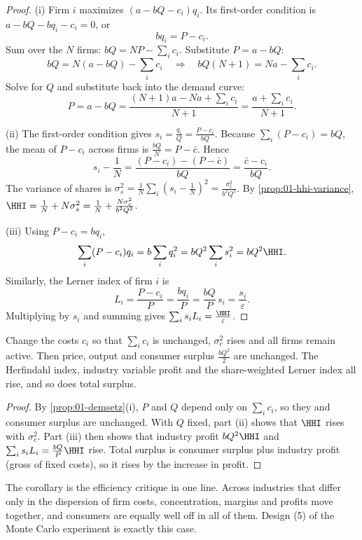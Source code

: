 \begin{proof}
(i) Firm $i$ maximizes $(a - bQ - c_i) q_i$. Its first-order condition is $a - bQ - b q_i - c_i = 0$, or
\[
b q_i = P - c_i .
\]
Sum over the $N$ firms: $bQ = NP - \sum_i c_i$. Substitute $P = a - bQ$:
\[
bQ = N(a - bQ) - \sum_i c_i \quad\Longrightarrow\quad bQ(N + 1) = Na - \sum_i c_i .
\]
Solve for $Q$ and substitute back into the demand curve:
\[
P = a - bQ = \frac{(N + 1)a - Na + \sum_i c_i}{N + 1} = \frac{a + \sum_i c_i}{N + 1}.
\]

(ii) The first-order condition gives $s_i = \frac{q_i}{Q} = \frac{P - c_i}{bQ}$. Because $\sum_i (P - c_i)
= bQ$, the mean of $P - c_i$ across firms is $\frac{bQ}{N} = P - \bar c$. Hence
\[
s_i - \frac{1}{N} = \frac{(P - c_i) - (P - \bar c)}{bQ} = \frac{\bar c - c_i}{bQ}.
\]
The variance of shares is $\sigma_s^2 = \frac{1}{N}\sum_i (s_i - \frac{1}{N})^2 = \frac{\sigma_c^2}{b^2
Q^2}$. By \cref{prop:01-hhi-variance}, $\HHI = \frac{1}{N} + N\sigma_s^2 = \frac{1}{N} + \frac{N
\sigma_c^2}{b^2 Q^2}$.

(iii) Using $P - c_i = b q_i$,
\[
\sum_i (P - c_i) q_i = b \sum_i q_i^2 = bQ^2 \sum_i s_i^2 = bQ^2 \HHI .
\]
Similarly, the Lerner index of firm $i$ is
\[
L_i = \frac{P - c_i}{P} = \frac{b q_i}{P} = \frac{bQ}{P} \, s_i = \frac{s_i}{\varepsilon}.
\]
Multiplying by $s_i$ and summing gives $\sum_i s_i L_i = \frac{\HHI}{\varepsilon}$.
\end{proof}

\begin{corollary}\label{prop:01-demsetz-spread}
Change the costs $c_i$ so that $\sum_i c_i$ is unchanged, $\sigma_c^2$ rises and all firms remain
active. Then price, output and consumer surplus $\frac{bQ^2}{2}$ are unchanged. The Herfindahl index,
industry variable profit and the share-weighted Lerner index all rise, and so does total surplus.
\end{corollary}

\begin{proof}
By \cref{prop:01-demsetz}(i), $P$ and $Q$ depend only on $\sum_i c_i$, so they and consumer surplus are
unchanged. With $Q$ fixed, part (ii) shows that $\HHI$ rises with $\sigma_c^2$. Part (iii) then shows that
industry profit $bQ^2\HHI$ and $\sum_i s_i L_i = \frac{bQ}{P}\HHI$ rise. Total surplus is consumer surplus
plus industry profit (gross of fixed costs), so it rises by the increase in profit.
\end{proof}

The corollary is the efficiency critique in one line. Across industries that differ only in the
dispersion of firm costs, concentration, margins and profits move together, and consumers are equally
well off in all of them. Design (5) of the Monte Carlo experiment is exactly this case.

